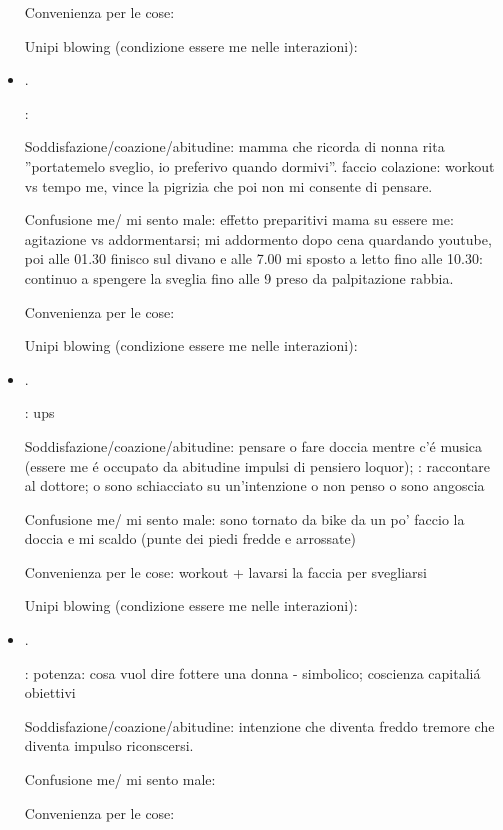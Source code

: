 \begin{itemize}
Convenienza per le cose:

Unipi blowing (condizione essere me nelle interazioni):

\item {}.

:

Soddisfazione/coazione/abitudine: mamma che ricorda di nonna rita ''portatemelo sveglio, io preferivo quando dormivi''. faccio colazione: workout vs tempo me, vince la pigrizia che poi non mi consente di pensare.

Confusione me/ mi sento male: effetto preparitivi mama su essere me: agitazione vs addormentarsi; mi addormento dopo cena quardando youtube, poi alle 01.30 finisco sul divano e alle 7.00 mi sposto a letto fino alle 10.30: continuo a spengere la sveglia fino alle 9 preso da palpitazione rabbia.


Convenienza per le cose:

Unipi blowing (condizione essere me nelle interazioni):

\item {}.

: ups

Soddisfazione/coazione/abitudine: pensare o fare doccia mentre c'\'e musica (essere me \'e occupato da abitudine impulsi di pensiero loquor); : raccontare al dottore; o sono schiacciato su un'intenzione o non penso o sono angoscia

Confusione me/ mi sento male: sono tornato da bike da un po' faccio la doccia e mi scaldo (punte dei piedi  fredde e arrossate)

Convenienza per le cose: workout + lavarsi la faccia per svegliarsi

Unipi blowing (condizione essere me nelle interazioni):

\item {}.

: potenza: cosa vuol dire fottere una donna - simbolico; coscienza capitali\'a obiettivi

Soddisfazione/coazione/abitudine: intenzione che diventa freddo tremore che diventa impulso riconscersi.

Confusione me/ mi sento male:

Convenienza per le cose:


\end{itemize}
